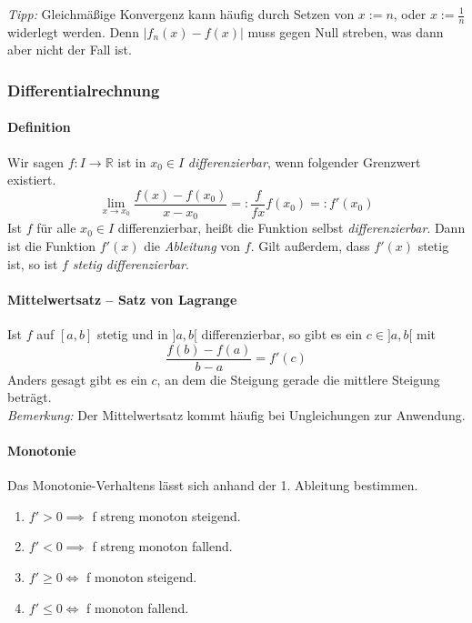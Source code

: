 \documentclass[a4paper, 9pt, DIV=24]{scrartcl}
\newcommand{\R}{\mathbb{R}}
\begin{document}
\emph{Tipp: } Gleichmäßige Konvergenz kann häufig durch Setzen von $x := n$, oder $x := \frac{1}{n}$ widerlegt werden.
Denn $|f_n(x) - f(x)|$ muss gegen Null streben, was dann aber nicht der Fall ist.

\subsubsection{Differentialrechnung}

\paragraph{Definition}
Wir sagen $f: I \rightarrow \R$ ist in $x_0 \in I$ \emph{differenzierbar}, wenn folgender Grenzwert existiert.
\[
 \lim_{x\rightarrow x_0} \dfrac{f(x) - f(x_0)}{x - x_0} =: \dfrac{f}{fx} f(x_0) =: f'(x_0)
\]
Ist $f$ für alle $x_0 \in I$ differenzierbar, heißt die Funktion selbst \emph{differenzierbar}.
Dann ist die Funktion $f'(x)$ die \emph{Ableitung} von $f$.
Gilt außerdem, dass $f'(x)$ stetig ist, so ist $f$ \emph{stetig differenzierbar}.

\paragraph{Mittelwertsatz -- Satz von Lagrange}
Ist $f$ auf $[a,b]$ stetig und in $]a,b[$ differenzierbar, so gibt es ein $c \in ]a,b[$ mit
\[ \dfrac{f(b) - f(a)}{b-a} = f'(c) \]
Anders gesagt gibt es ein $c$, an dem die Steigung gerade die mittlere Steigung beträgt.\\
\emph{Bemerkung:} Der Mittelwertsatz kommt häufig bei Ungleichungen zur Anwendung.

\paragraph{Monotonie}
Das Monotonie-Verhaltens lässt sich anhand der 1. Ableitung bestimmen.
\begin{enumerate}[label={(}\arabic*{)}]
 \item $f' > 0 \implies $ f streng monoton steigend.
 \item $f' < 0 \implies $ f streng monoton fallend.
 \item $f' \geq 0 \iff $ f monoton steigend.
 \item $f' \leq 0 \iff $ f monoton fallend.
\end{enumerate}
\end{document}
